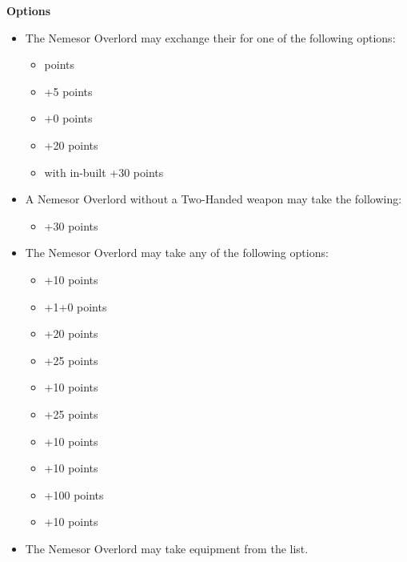 \begin{minipage}[t]{0.72\textwidth}
	\vspace*{2em}
	\textbf{Options}
	\begin{itemize}
		\item The Nemesor Overlord may exchange their  for one of the following options:
		\begin{itemize}			
			\item {}  points
			\item {} \dotfill +5 points
			\item {} \dotfill +0 points
			\item {} \dotfill +20 points
			\item {} with in-built  \dotfill +30 points
		\end{itemize}
		\item A Nemesor Overlord without a Two-Handed weapon may take the following:
		\begin{itemize}
			\item {} \dotfill +30 points
		\end{itemize}
		\item The Nemesor Overlord may take any of the following options:
		\begin{itemize}
			\item {} \dotfill +10 points
			\item {} \dotfill +1+0 points
			\item {} \dotfill +20 points
			\item {} \dotfill +25 points
			\item {} \dotfill +10 points
			\item {} \dotfill +25 points
			\item {} \dotfill +10 points
			\item {} \dotfill +10 points
			\item {} \dotfill +100 points
			\item {} \dotfill +10 points
		\end{itemize}
		\item The Nemesor Overlord may take equipment from the  list.
	\end{itemize}
\end{minipage}



